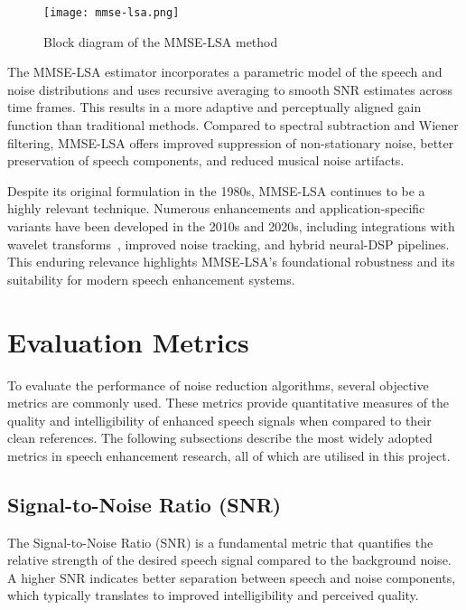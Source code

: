 \begin{figure}[H]
    \centering
    \texttt{[image: mmse-lsa.png]}
    \caption{\label{fig:mmse_lsa_block} Block diagram of the MMSE-LSA method}
\end{figure}

The MMSE-LSA estimator incorporates a parametric model of the speech and noise distributions and uses recursive averaging to smooth SNR estimates across time frames. This results in a more adaptive and perceptually aligned gain function than traditional methods. Compared to spectral subtraction and Wiener filtering, MMSE-LSA offers improved suppression of non-stationary noise, better preservation of speech components, and reduced musical noise artifacts.

Despite its original formulation in the 1980s, MMSE-LSA continues to be a highly relevant technique. Numerous enhancements and application-specific variants have been developed in the 2010s and 2020s, including integrations with wavelet transforms~\cite{wei2016mmse}, improved noise tracking, and hybrid neural-DSP pipelines. This enduring relevance highlights MMSE-LSA's foundational robustness and its suitability for modern speech enhancement systems.

\section{Evaluation Metrics}
\label{sec:evaluation_metrics}

To evaluate the performance of noise reduction algorithms, several objective metrics are commonly used. These metrics provide quantitative measures of the quality and intelligibility of enhanced speech signals when compared to their clean references. The following subsections describe the most widely adopted metrics in speech enhancement research, all of which are utilised in this project.

\subsection{Signal-to-Noise Ratio (SNR)}
\label{subsec:snr}

The Signal-to-Noise Ratio (SNR) is a fundamental metric that quantifies the relative strength of the desired speech signal compared to the background noise. A higher SNR indicates better separation between speech and noise components, which typically translates to improved intelligibility and perceived quality.

